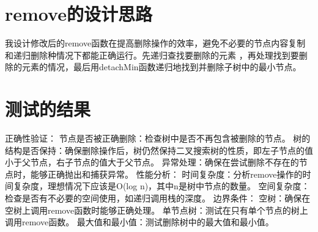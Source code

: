 \documentclass[UTF8]{ctexart}
\begin{document}
\pagestyle{fancy}
\fancyhead{}

\section{remove的设计思路}
我设计修改后的remove函数在提高删除操作的效率，避免不必要的节点内容复制和递归删除种情况下都能正确运行。先递归查找要删除的元素  
，再处理找到要删除的元素的情况，最后用detachMin函数递归地找到并删除子树中的最小节点。

\section{测试的结果}
正确性验证：
节点是否被正确删除：检查树中是否不再包含被删除的节点。
树的结构是否保持：确保删除操作后，树仍然保持二叉搜索树的性质，即左子节点的值小于父节点，右子节点的值大于父节点。
异常处理：确保在尝试删除不存在的节点时，能够正确抛出和捕获异常。
性能分析：
时间复杂度：分析remove操作的时间复杂度，理想情况下应该是O(log n)，其中n是树中节点的数量。
空间复杂度：检查是否有不必要的空间使用，如递归调用栈的深度。
边界条件：
空树：确保在空树上调用remove函数时能够正确处理。
单节点树：测试在只有单个节点的树上调用remove函数。
最大值和最小值：测试删除树中的最大值和最小值。
  
\end{document}
